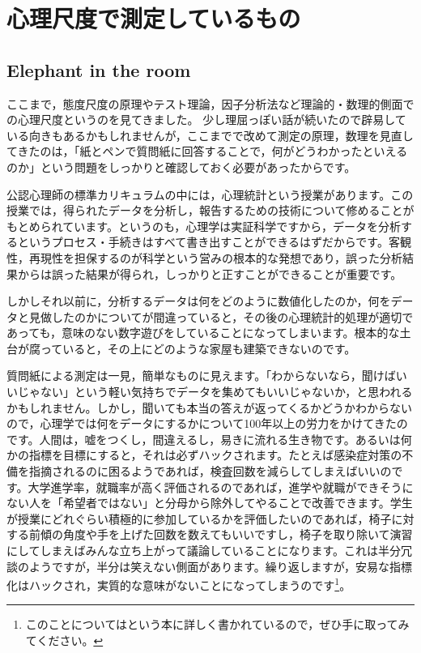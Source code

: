 \documentclass{ltjsbook}
\begin{document}
\chapter{心理尺度で測定しているもの}
\label{H06_Attitude}
\section{Elephant in the room}
ここまで，態度尺度の原理やテスト理論，因子分析法など理論的・数理的側面での心理尺度というのを見てきました。
少し理屈っぽい話が続いたので辟易している向きもあるかもしれませんが，ここまでで改めて測定の原理，数理を見直してきたのは，「紙とペンで質問紙に回答することで，何がどうわかったといえるのか」という問題をしっかりと確認しておく必要があったからです。

公認心理師の標準カリキュラムの中には，心理統計という授業があります。この授業では，得られたデータを分析し，報告するための技術について修めることがもとめられています。というのも，心理学は実証科学ですから，データを分析するというプロセス・手続きはすべて書き出すことができるはずだからです。客観性，再現性を担保するのが科学という営みの根本的な発想であり，誤った分析結果からは誤った結果が得られ，しっかりと正すことができることが重要です。

しかしそれ以前に，分析するデータは何をどのように数値化したのか，何をデータと見做したのかについてが間違っていると，その後の心理統計的処理が適切であっても，意味のない数字遊びをしていることになってしまいます。根本的な土台が腐っていると，その上にどのような家屋も建築できないのです。

質問紙による測定は一見，簡単なものに見えます。「わからないなら，聞けばいいじゃない」という軽い気持ちでデータを集めてもいいじゃないか，と思われるかもしれません。しかし，聞いても本当の答えが返ってくるかどうかわからないので，心理学では何をデータにするかについて100年以上の労力をかけてきたのです。人間は，嘘をつくし，間違えるし，易きに流れる生き物です。あるいは何かの指標を目標にすると，それは必ずハックされます。たとえば感染症対策の不備を指摘されるのに困るようであれば，検査回数を減らしてしまえばいいのです。大学進学率，就職率が高く評価されるのであれば，進学や就職ができそうにない人を「希望者ではない」と分母から除外してやることで改善できます。学生が授業にどれぐらい積極的に参加しているかを評価したいのであれば，椅子に対する前傾の角度や手を上げた回数を数えてもいいですし，椅子を取り除いて演習にしてしまえばみんな立ち上がって議論していることになります。これは半分冗談のようですが，半分は笑えない側面があります。繰り返しますが，安易な指標化はハックされ，実質的な意味がないことになってしまうのです\footnote{このことについては\citet{Jerry2019}という本に詳しく書かれているので，ぜひ手に取ってみてください。}。
\end{document}
